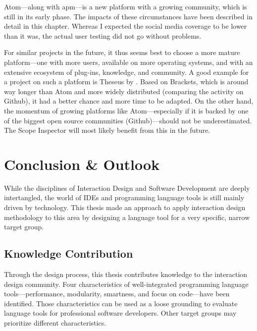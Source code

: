 Atom—along with \ac{apm}—is a new platform with a growing community,
which is still in its early phase. The impacts of these circumstances
have been described in detail in this chapter. Whereas I expected the
social media coverage to be lower than it was, the actual user testing
did not go without problems.

For similar projects in the future, it thus seems best to choose a more
mature platform—one with more users, available on more operating
systems, and with an extensive ecosystem of plug-ins, knowledge, and
community. A good example for a project on such a platform is Theseus by
. Based on Brackets, which is around way longer than
Atom and more widely distributed (comparing the activity on Github), it
had a better chance and more time to be adapted. On the other hand, the
momentum of growing platforms like Atom—especially if it is backed by
one of the biggest open source communities (Github)—should not be
underestimated. The Scope Inspector will most likely benefit from this
in the future.

\chapter{Conclusion \& Outlook}\label{conclusion-outlook}

While the disciplines of Interaction Design and Software Development are
deeply intertangled, the world of IDEs and programming language tools is
still mainly driven by technology. This thesis made an approach to apply
interaction design methodology to this area by designing a language tool
for a very specific, narrow target group.

\section{Knowledge Contribution}\label{knowledge-contribution}

Through the design process, this thesis contributes knowledge to the
interaction design community. Four characteristics of well-integrated
programming language tools—performance, modularity, smartness, and focus
on code—have been identified. Those characteristics can be used as a
loose grounding to evaluate language tools for professional software
developers. Other target groups may prioritize different
characteristics.

